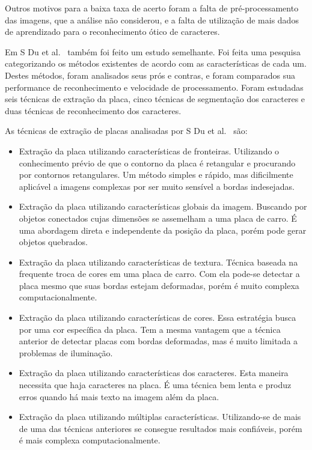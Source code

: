 Outros motivos para a baixa taxa de acerto foram a falta de pré-processamento
das imagens, que a análise não considerou, e a falta de utilização de mais dados de
aprendizado para o reconhecimento ótico de caracteres.

Em S Du et al.~\cite{s2013automatic} também foi feito um estudo semelhante. Foi feita uma pesquisa categorizando os métodos existentes de acordo com as características de cada um. Destes métodos, foram analisados seus prós e contras, e foram comparados sua performance de reconhecimento e velocidade de processamento. Foram estudadas seis técnicas de extração da placa, cinco técnicas de segmentação dos caracteres e duas técnicas de reconhecimento dos caracteres.

As técnicas de extração de placas analisadas por S Du et al.~\cite{s2013automatic} são:

\begin{itemize}
	\item Extração da placa utilizando características de fronteiras. Utilizando o conhecimento prévio de que o contorno da placa é retangular e procurando por contornos retangulares. Um método simples e rápido, mas dificilmente aplicável a imagens complexas por ser muito sensível a bordas indesejadas.
    \item Extração da placa utilizando características globais da imagem. Buscando por objetos conectados cujas dimensões se assemelham a uma placa de carro. É uma abordagem direta e independente da posição da placa, porém pode gerar objetos quebrados.
    \item Extração da placa utilizando características de textura. Técnica baseada na frequente troca de cores em uma placa de carro. Com ela pode-se detectar a placa mesmo que suas bordas estejam deformadas, porém é muito complexa computacionalmente.
    \item Extração da placa utilizando características de cores. Essa estratégia busca por uma cor específica da placa. Tem a mesma vantagem que a técnica anterior de detectar placas com bordas deformadas, mas é muito limitada a problemas de iluminação.
	\item Extração da placa utilizando características dos caracteres. Esta maneira necessita que haja caracteres na placa. É uma técnica bem lenta e produz erros quando há mais texto na imagem além da placa.
    \item Extração da placa utilizando múltiplas características. Utilizando-se de mais de uma das técnicas anteriores se consegue resultados mais confiáveis, porém é mais complexa computacionalmente.
\end{itemize}

